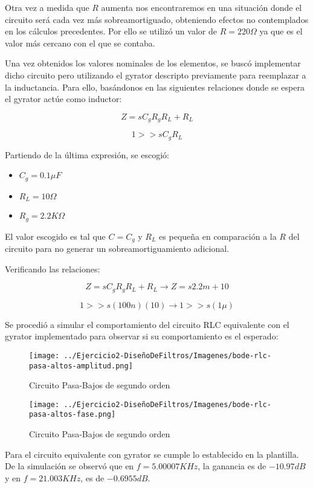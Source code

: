 Otra vez a medida que $R$ aumenta nos encontraremos en una situación donde el circuito será
cada vez más sobreamortiguado, obteniendo efectos no contemplados en los cálculos precedentes. 
Por ello se utilizó un valor de $R= 220 \Omega$ ya que es el valor más cercano con el que se contaba.

Una vez obtenidos los valores nominales de los elementos, se buscó implementar dicho circuito pero utilizando el gyrator descripto previamente
para reemplazar a la inductancia. Para ello, basándonos 
en las siguientes relaciones donde se espera el gyrator actúe como inductor:

$$Z=sC_gR_gR_L+R_L$$

$$1 >> sC_gR_L$$

Partiendo de la última expresión, se escogió:

\begin{itemize}
	\item $C_g=0.1 \mu F$
	\item $R_L=10 \Omega$
	\item $R_g=2.2K \Omega$
\end{itemize}

El valor escogido es tal que $C=C_g$ y $R_L$ es pequeña en comparación a la $R$ del circuito para no generar
un sobreamortiguamiento adicional.

Verificando las relaciones:

$$Z=sC_gR_gR_L+R_L \longrightarrow Z = s2.2m + 10$$

$$1 >> s(100n)(10) \longrightarrow 1  >> s(1\mu)$$

Se procedió a simular el comportamiento del circuito RLC equivalente con el gyrator implementado para observar si su comportamiento es el esperado:


\begin{figure}[H]
    \centering
    \texttt{[image: ../Ejercicio2-DiseñoDeFiltros/Imagenes/bode-rlc-pasa-altos-amplitud.png]}
    \caption{Circuito Pasa-Bajos de segundo orden}
\end{figure}

\begin{figure}[H]
    \centering
    \texttt{[image: ../Ejercicio2-DiseñoDeFiltros/Imagenes/bode-rlc-pasa-altos-fase.png]}
    \caption{Circuito Pasa-Bajos de segundo orden}
\end{figure}

Para el circuito equivalente con gyrator se cumple lo establecido en la plantilla.
De la simulación se observó que en $f=5.00007 KHz$, la ganancia es de $-10.97 dB$ y en $f=21.003KHz$, es de $-0.6955 dB$.

